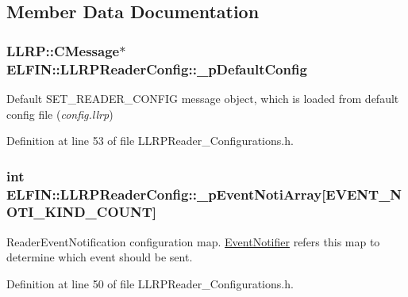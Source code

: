\subsection{Member Data Documentation}
\hypertarget{class_e_l_f_i_n_1_1_l_l_r_p_reader_config_a1ea5b8b04a69ffaf325a7c989c1cf3af}{
\subsubsection[{\-\_\-p\-Default\-Config}]{\setlength{\rightskip}{0pt plus 5cm}L\-L\-R\-P\-::\-C\-Message$\ast$ E\-L\-F\-I\-N\-::\-L\-L\-R\-P\-Reader\-Config\-::\-\_\-p\-Default\-Config}}\label{class_e_l_f_i_n_1_1_l_l_r_p_reader_config_a1ea5b8b04a69ffaf325a7c989c1cf3af}


Default S\-E\-T\-\_\-\-R\-E\-A\-D\-E\-R\-\_\-\-C\-O\-N\-F\-I\-G message object, which is loaded from default config file ({\itshape config.\-llrp}) 



Definition at line 53 of file L\-L\-R\-P\-Reader\-\_\-\-Configurations.\-h.

\hypertarget{class_e_l_f_i_n_1_1_l_l_r_p_reader_config_ac956371ce5b8c395bdbf5debf4fe9968}{
\subsubsection[{\-\_\-p\-Event\-Noti\-Array}]{\setlength{\rightskip}{0pt plus 5cm}int E\-L\-F\-I\-N\-::\-L\-L\-R\-P\-Reader\-Config\-::\-\_\-p\-Event\-Noti\-Array\mbox{[}E\-V\-E\-N\-T\-\_\-\-N\-O\-T\-I\-\_\-\-K\-I\-N\-D\-\_\-\-C\-O\-U\-N\-T\mbox{]}}}\label{class_e_l_f_i_n_1_1_l_l_r_p_reader_config_ac956371ce5b8c395bdbf5debf4fe9968}


Reader\-Event\-Notification configuration map. \hyperlink{class_e_l_f_i_n_1_1_event_notifier}{Event\-Notifier} refers this map to determine which event should be sent. 



Definition at line 50 of file L\-L\-R\-P\-Reader\-\_\-\-Configurations.\-h.

